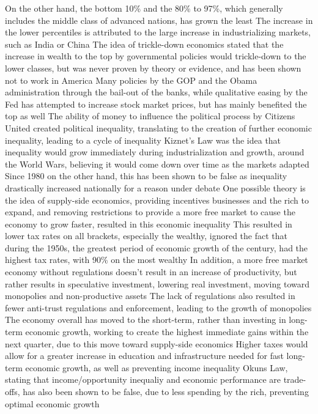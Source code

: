 \documentclass[11 pt, twoside]{article}
\newenvironment{outline*}
{
	\begin{outline}[enumerate]
	}
	{\end{outline}
}
\begin{document}
\begin{outline*}
\2 On the other hand, the bottom 10\% and the 80\% to 97\%, which generally includes the middle class of advanced nations, has grown the least
\2 The increase in the lower percentiles is attributed to the large increase in industrializing markets, such as India or China
\1 The idea of trickle-down economics stated that the increase in wealth to the top by governmental policies would trickle-down to the lower classes, but was never proven by theory or evidence, and has been shown not to work in America
\2 Many policies by the GOP and the Obama administration through the bail-out of the banks, while qualitative easing by the Fed has attempted to increase stock market prices, but has mainly benefited the top as well
\2 The ability of money to influence the political process by Citizens United created political inequality, translating to the creation of further economic inequality, leading to a cycle of inequality
\1 Kiznet's Law was the idea that inequality would grow immediately during industrialization and growth, around the World Wars, believing it would come down over time as the markets adapted
\2 Since 1980 on the other hand, this has been shown to be false as inequality drastically increased nationally for a reason under debate
\2 One possible theory is the idea of supply-side economics, providing incentives businesses and the rich to expand, and removing restrictions to provide a more free market to cause the economy to grow faster, resulted in this economic inequality
\2 This resulted in lower tax rates on all brackets, especially the wealthy, ignored the fact that during the 1950s, the greatest period of economic growth of the century, had the highest tax rates, with 90\% on the most wealthy
\2 In addition, a more free market economy without regulations doesn't result in an increase of productivity, but rather results in speculative investment, lowering real investment, moving toward monopolies and non-productive assets
\2 The lack of regulations also resulted in fewer anti-trust regulations and enforcement, leading to the growth of monopolies
\1 The economy overall has moved to the short-term, rather than investing in long-term economic growth, working to create the highest immediate gains within the next quarter, due to this move toward supply-side economics
\2 Higher taxes would allow for a greater increase in education and infrastructure needed for fast long-term economic growth, as well as preventing income inequality
\1 Okuns Law, stating that income/opportunity inequaliy and economic performance are trade-offs, has also been shown to be false, due to less spending by the rich, preventing optimal economic growth
\end{outline*}
\end{document}
